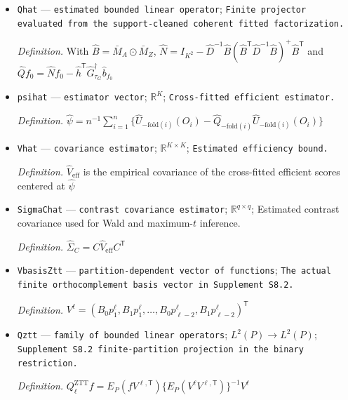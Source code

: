 \documentclass{article}
\begin{document}
\begin{itemize}
  \par\smallskip\noindent\emph{Definition.} \(\widehat U=U(\widehat\eta)\)
  \item \texttt{Qhat} --- \texttt{estimated bounded linear operator}; \texttt{Finite projector evaluated from the support-\allowbreak{}cleaned coherent fitted factorization.}
  \par\smallskip\noindent\emph{Definition.} With \(\widehat B=\bar M_A\odot\bar M_Z\), \(\widehat N=I_{K^2}-\widehat D^{-1}\widehat B(\widehat B^{\mathsf T}\widehat D^{-1}\widehat B)^+\widehat B^{\mathsf T}\) and \(\widehat Qf_0=\widehat Nf_0-\widehat h^{\mathsf T}\widehat G_{\tau_G}^{\dagger}\widehat b_{f_0}\)
  \item \texttt{psihat} --- \texttt{estimator vector}; \(\mathbb R^{K}\); \texttt{Cross-\allowbreak{}fitted efficient estimator.}
  \par\smallskip\noindent\emph{Definition.} \(\widehat\psi=n^{-1}\sum_{i=1}^{n}\{\widehat U_{-\mathrm{fold}(i)}(O_i)-\widehat Q_{-\mathrm{fold}(i)}\widehat U_{-\mathrm{fold}(i)}(O_i)\}\)
  \item \texttt{Vhat} --- \texttt{covariance estimator}; \(\mathbb R^{K\times K}\); \texttt{Estimated efficiency bound.}
  \par\smallskip\noindent\emph{Definition.} \(\widehat V_{\mathrm{eff}}\) is the empirical covariance of the cross-fitted efficient scores centered at \(\widehat\psi\)
  \item \texttt{SigmaChat} --- \texttt{contrast covariance estimator}; \(\mathbb R^{q\times q}\); Estimated contrast covariance used for Wald and maximum-\(t\) inference.
  \par\smallskip\noindent\emph{Definition.} \(\widehat\Sigma_C=C\widehat V_{\mathrm{eff}}C^{\mathsf T}\)
  \item \texttt{VbasisZtt} --- \texttt{partition-\allowbreak{}dependent vector of functions}; \texttt{The actual finite orthocomplement basis vector in Supplement S8.2.}
  \par\smallskip\noindent\emph{Definition.} \(V^{\ell}=(B_0p_1^{\ell},B_1p_1^{\ell},\ldots,B_0p_{\ell-2}^{\ell},B_1p_{\ell-2}^{\ell})^{\mathsf T}\)
  \item \texttt{Qztt} --- \texttt{family of bounded linear operators}; \(L^{2}(P)\to L^{2}(P)\); \texttt{Supplement S8.2 finite-\allowbreak{}partition projection in the binary restriction.}
  \par\smallskip\noindent\emph{Definition.} \(Q_{\ell}^{\mathrm{ZTT}}f=E_P(fV^{\ell,\mathsf T})\{E_P(V^{\ell}V^{\ell,\mathsf T})\}^{-1}V^{\ell}\)

\end{itemize}
\end{document}
